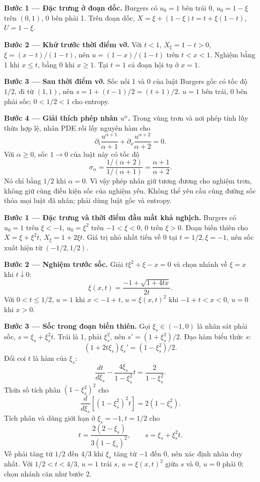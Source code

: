 \textbf{Bước 1 — Đặc trưng ở đoạn dốc.} Burgers có $u_0=1$ bên trái 0, $u_0=1-\xi$ trên $(0,1)$, 0 bên phải 1. Trên đoạn dốc, $X=\xi+(1-\xi)t=t+\xi(1-t)$, $U=1-\xi$.

\textbf{Bước 2 — Khử trước thời điểm vỡ.} Với $t<1$, $X_\xi=1-t>0$, $\xi=(x-t)/(1-t)$, nên $u=(1-x)/(1-t)$ trên $t<x<1$. Nghiệm bằng 1 khi $x\le t$, bằng 0 khi $x\ge1$. Tại $t=1$ cả đoạn hội tụ ở $x=1$.

\textbf{Bước 3 — Sau thời điểm vỡ.} Sốc nối 1 và 0 của luật Burgers gốc có tốc độ $1/2$, đi từ $(1,1)$, nên $s=1+(t-1)/2=(t+1)/2$. $u=1$ bên trái, 0 bên phải sốc; $0<1/2<1$ cho entropy.

\textbf{Bước 4 — Giải thích phép nhân $u^\alpha$.} Trong vùng trơn và nơi phép tính lũy thừa hợp lệ, nhân PDE rồi lấy nguyên hàm cho
\[\partial_t\frac{u^{\alpha+1}}{\alpha+1}+\partial_x\frac{u^{\alpha+2}}{\alpha+2}=0.\]
Với $\alpha\ge0$, sốc $1\to0$ của luật này có tốc độ
\[\sigma_\alpha=\frac{1/(\alpha+2)}{1/(\alpha+1)}=\frac{\alpha+1}{\alpha+2}.\]
Nó chỉ bằng $1/2$ khi $\alpha=0$. Vì vậy phép nhân giữ tương đương cho nghiệm trơn, không giữ cùng điều kiện sốc của nghiệm yếu. Không thể yêu cầu cùng đường sốc thỏa mọi luật đã nhân; phải dùng luật gốc và entropy.

\textbf{Bước 1 — Đặc trưng và thời điểm đầu mất khả nghịch.} Burgers có $u_0=1$ trên $\xi<-1$, $u_0=\xi^2$ trên $-1<\xi<0$, 0 trên $\xi>0$. Đoạn biến thiên cho $X=\xi+\xi^2t$, $X_\xi=1+2\xi t$. Giá trị nhỏ nhất tiến về 0 tại $t=1/2,\xi=-1$, nên sốc xuất hiện từ $(-1/2,1/2)$.

\textbf{Bước 2 — Nghiệm trước sốc.} Giải $t\xi^2+\xi-x=0$ và chọn nhánh về $\xi=x$ khi $t\downarrow0$:
\[\xi(x,t)=\frac{-1+\sqrt{1+4tx}}{2t}.\]
Với $0<t\le1/2$, $u=1$ khi $x<-1+t$, $u=\xi(x,t)^2$ khi $-1+t<x<0$, $u=0$ khi $x>0$.

\textbf{Bước 3 — Sốc trong đoạn biến thiên.} Gọi $\xi_s\in(-1,0)$ là nhãn sát phải sốc, $s=\xi_s+\xi_s^2t$. Trái là 1, phải $\xi_s^2$, nên $s'=(1+\xi_s^2)/2$. Đạo hàm biểu thức $s$:
\[(1+2t\xi_s)\xi_s'=(1-\xi_s^2)/2.\]
Đổi coi $t$ là hàm của $\xi_s$:
\[\frac{dt}{d\xi_s}-\frac{4\xi_s}{1-\xi_s^2}t=\frac2{1-\xi_s^2}.\]
Thừa số tích phân $(1-\xi_s^2)^2$ cho
\[\frac{d}{d\xi_s}[(1-\xi_s^2)^2t]=2(1-\xi_s^2).\]
Tích phân và dùng giới hạn ở $\xi_s=-1,t=1/2$ cho
\[t=\frac{2(2-\xi_s)}{3(1-\xi_s)^2},\qquad s=\xi_s+\xi_s^2t.\]
Vế phải tăng từ $1/2$ đến $4/3$ khi $\xi_s$ tăng từ $-1$ đến 0, nên xác định nhãn duy nhất. Với $1/2<t<4/3$, $u=1$ trái $s$, $u=\xi(x,t)^2$ giữa $s$ và 0, $u=0$ phải 0; chọn nhánh căn như bước 2.

